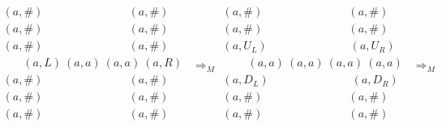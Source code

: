 \documentclass[xcolor=dvipsnames]{beamer}
\begin{document}
{{\scriptsize
\[
\begin{array}{l}
(a, \#)\ \ \ \ \ \ \ \ \ \ \ \ \ \ \ \ \ \ \ \ \ \ \ \ \ \ \ \ \ \ \ \ \ \ (a, \#) \\
(a, \#)\ \ \ \ \ \ \ \ \ \ \ \ \ \ \ \ \ \ \ \ \ \ \ \ \ \ \ \ \ \ \ \ \ \ (a, \#) \\
(a, \#)\ \ \ \ \ \ \ \ \ \ \ \ \ \ \ \ \ \ \ \ \ \ \ \ \ \ \ \ \ \ \ \ \ \ (a, \#) \\
\ \ \ \ \ \ \ \ (a, L)\ (a, a)\ (a, a)\ (a, R)\ \  \\
(a, \#)\ \ \ \ \ \ \ \ \ \ \ \ \ \ \ \ \ \ \ \ \ \ \ \ \ \ \ \ \ \ \ \ \ \ (a, \#) \\
(a, \#)\ \ \ \ \ \ \ \ \ \ \ \ \ \ \ \ \ \ \ \ \ \ \ \ \ \ \ \ \ \ \ \ \ \ (a, \#) \\
(a, \#)\ \ \ \ \ \ \ \ \ \ \ \ \ \ \ \ \ \ \ \ \ \ \ \ \ \ \ \ \ \ \ \ \ \ (a, \#) \\
\end{array}
\Rightarrow_M
\begin{array}{l}
(a, \#)\ \ \ \ \ \ \ \ \ \ \ \ \ \ \ \ \ \ \ \ \ \ \ \ \ \ \ \ \ \ \ \ \ \ (a, \#) \\
(a, \#)\ \ \ \ \ \ \ \ \ \ \ \ \ \ \ \ \ \ \ \ \ \ \ \ \ \ \ \ \ \ \ \ \ \ (a, \#) \\
(a, U_L)\ \ \ \ \ \ \ \ \ \ \ \ \ \ \ \ \ \ \ \ \ \ \ \ \ \ \ \ \ \ \ \ \ (a, U_R) \\
\ \ \ \ \ \ \ \ \ \ (a, a)\ (a, a)\ (a, a)\ (a, a)\ \  \\
(a, D_L)\ \ \ \ \ \ \ \ \ \ \ \ \ \ \ \ \ \ \ \ \ \ \ \ \ \ \ \ \ \ \ \ \ (a, D_R) \\
(a, \#)\ \ \ \ \ \ \ \ \ \ \ \ \ \ \ \ \ \ \ \ \ \ \ \ \ \ \ \ \ \ \ \ \ \ (a, \#) \\
(a, \#)\ \ \ \ \ \ \ \ \ \ \ \ \ \ \ \ \ \ \ \ \ \ \ \ \ \ \ \ \ \ \ \ \ \ (a, \#) \\
\end{array}
\Rightarrow_M
\]
}

}
\end{document}
